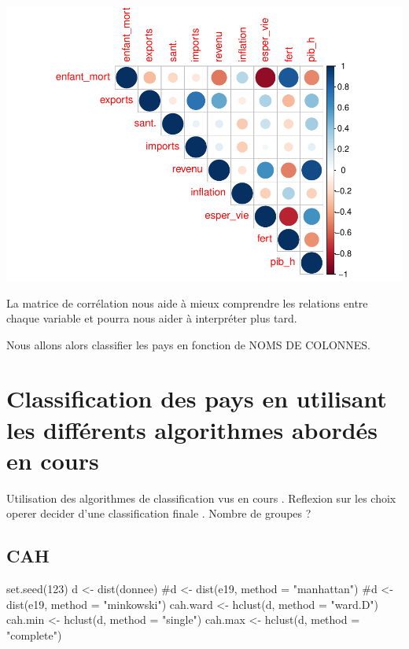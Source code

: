 \documentclass[
]{article}
\newenvironment{Shaded}{}{}
\newcommand{\AttributeTok}[1]{#1}
\newcommand{\CommentTok}[1]{\textcolor[rgb]{0.00,0.50,0.00}{#1}}
\newcommand{\DecValTok}[1]{#1}
\newcommand{\FunctionTok}[1]{#1}
\newcommand{\NormalTok}[1]{#1}
\newcommand{\OtherTok}[1]{\textcolor[rgb]{1.00,0.25,0.00}{#1}}
\newcommand{\StringTok}[1]{\textcolor[rgb]{0.00,0.50,0.50}{#1}}
\begin{document}
\includegraphics{Projet_files/figure-latex/unnamed-chunk-9-1.pdf}

La matrice de corrélation nous aide à mieux comprendre les relations
entre chaque variable et pourra nous aider à interpréter plus tard.

Nous allons alors classifier les pays en fonction de NOMS DE COLONNES.

\hypertarget{classification-des-pays-en-utilisant-les-diffuxe9rents-algorithmes-aborduxe9s-en-cours}{%
\section{Classification des pays en utilisant les différents algorithmes
abordés en
cours}\label{classification-des-pays-en-utilisant-les-diffuxe9rents-algorithmes-aborduxe9s-en-cours}}

Utilisation des algorithmes de classification vus en cours . Reflexion
sur les choix operer decider d'une classification finale . Nombre de
groupes ?

\hypertarget{cah}{%
\subsection{CAH}\label{cah}}

\begin{Shaded}
\begin{Highlighting}[]
\FunctionTok{set.seed}\NormalTok{(}\DecValTok{123}\NormalTok{)}
\NormalTok{d }\OtherTok{\textless{}{-}} \FunctionTok{dist}\NormalTok{(donnee)}
\CommentTok{\#d \textless{}{-} dist(e19, method = "manhattan")}
\CommentTok{\#d \textless{}{-} dist(e19, method = "minkowski")}
\NormalTok{cah.ward }\OtherTok{\textless{}{-}} \FunctionTok{hclust}\NormalTok{(d, }\AttributeTok{method =} \StringTok{"ward.D"}\NormalTok{)}
\NormalTok{cah.min }\OtherTok{\textless{}{-}} \FunctionTok{hclust}\NormalTok{(d, }\AttributeTok{method =} \StringTok{"single"}\NormalTok{)}
\NormalTok{cah.max }\OtherTok{\textless{}{-}} \FunctionTok{hclust}\NormalTok{(d, }\AttributeTok{method =} \StringTok{"complete"}\NormalTok{)}
\end{Highlighting}
\end{Shaded}
\end{document}
